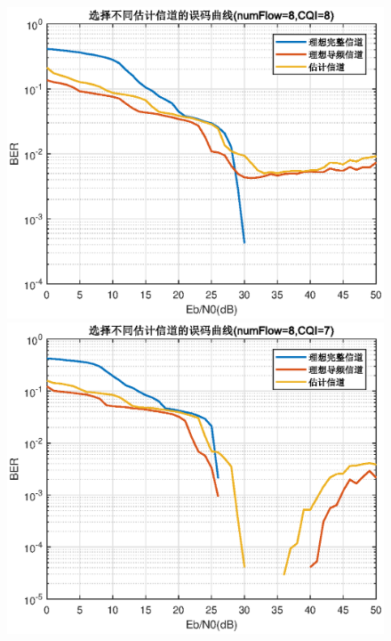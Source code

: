 \documentclass{article}
\begin{document}
\begin{figure}[htbp]
	\centering
	\begin{minipage}[t]{0.48\textwidth}
	\centering
	\includegraphics[width=\textwidth]{plot/plot_CQI8.eps}
	\end{minipage}
	\begin{minipage}[t]{0.48\textwidth}
	\centering
	\includegraphics[width=\textwidth]{plot/plot_CQI7.eps}
	\end{minipage}
\end{figure}
\end{document}
